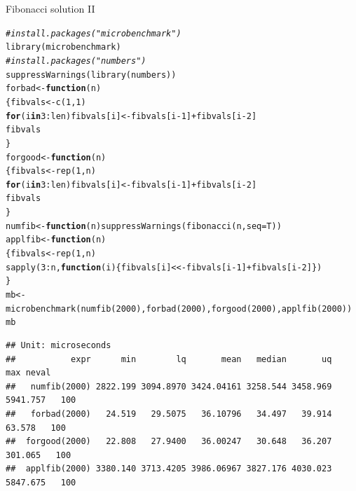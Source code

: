 \documentclass[xcolor=table,           xcolor=dvipsnames]{beamer}\usepackage[]{graphicx}\usepackage[]{color}
\makeatletter
\newcommand{\hlnum}[1]{\textcolor[rgb]{0,0,0}{#1}}
\newcommand{\hlcom}[1]{\textcolor[rgb]{0,0.392,0}{\textit{#1}}}
\newcommand{\hlopt}[1]{\textcolor[rgb]{0,0,0}{#1}}
\newcommand{\hlstd}[1]{\textcolor[rgb]{0,0,0}{#1}}
\newcommand{\hlkwa}[1]{\textcolor[rgb]{1,0,0}{\textbf{#1}}}
\newcommand{\hlkwb}[1]{\textcolor[rgb]{0,0,0}{#1}}
\newcommand{\hlkwc}[1]{\textcolor[rgb]{1,0,1}{#1}}
\newcommand{\hlkwd}[1]{\textcolor[rgb]{0,0,1}{#1}}
\newenvironment{kframe}{%
 \def\at@end@of@kframe{}%
 \ifinner\ifhmode%
  \def\at@end@of@kframe{\end{minipage}}%
  \begin{minipage}{\columnwidth}%
 \fi\fi%
 \def\FrameCommand##1{\hskip\@totalleftmargin \hskip-\fboxsep
 \colorbox{shadecolor}{##1}\hskip-\fboxsep
     \hskip-\linewidth \hskip-\@totalleftmargin \hskip\columnwidth}%
 \MakeFramed {\advance\hsize-\width
   \@totalleftmargin\z@ \linewidth\hsize
   \@setminipage}}%
 {\par\unskip\endMakeFramed%
 \at@end@of@kframe}
\newenvironment{knitrout}{}{} %
\makeatother
\begin{document}
\begin{frame}[fragile]{Fibonacci solution II}
\begin{knitrout}\tiny
{}\color{fgcolor}\begin{kframe}
\begin{alltt}
\hlcom{#install.packages("microbenchmark")}
\hlkwd{library}\hlstd{(microbenchmark)}
\hlcom{#install.packages("numbers")}
\hlkwd{suppressWarnings}\hlstd{(}\hlkwd{library}\hlstd{(numbers))}
\hlstd{forbad} \hlkwb{<-} \hlkwa{function}\hlstd{(}\hlkwc{n}\hlstd{)}
  \hlstd{\{fibvals} \hlkwb{<-} \hlkwd{c}\hlstd{(}\hlnum{1}\hlstd{,}\hlnum{1}\hlstd{)}
  \hlkwa{for} \hlstd{(i} \hlkwa{in} \hlnum{3}\hlopt{:}\hlstd{len) fibvals[i]} \hlkwb{<-} \hlstd{fibvals[i}\hlopt{-}\hlnum{1}\hlstd{]}\hlopt{+}\hlstd{fibvals[i}\hlopt{-}\hlnum{2}\hlstd{]}
  \hlstd{fibvals}
  \hlstd{\}}
\hlstd{forgood} \hlkwb{<-} \hlkwa{function}\hlstd{(}\hlkwc{n}\hlstd{)}
  \hlstd{\{fibvals} \hlkwb{<-} \hlkwd{rep}\hlstd{(}\hlnum{1}\hlstd{,n)}
  \hlkwa{for} \hlstd{(i} \hlkwa{in} \hlnum{3}\hlopt{:}\hlstd{len) fibvals[i]} \hlkwb{<-} \hlstd{fibvals[i}\hlopt{-}\hlnum{1}\hlstd{]}\hlopt{+}\hlstd{fibvals[i}\hlopt{-}\hlnum{2}\hlstd{]}
  \hlstd{fibvals}
  \hlstd{\}}
\hlstd{numfib} \hlkwb{<-} \hlkwa{function}\hlstd{(}\hlkwc{n}\hlstd{)} \hlkwd{suppressWarnings}\hlstd{(}\hlkwd{fibonacci}\hlstd{(n,} \hlkwc{seq}\hlstd{=T))}
\hlstd{applfib} \hlkwb{<-} \hlkwa{function}\hlstd{(}\hlkwc{n}\hlstd{)}
  \hlstd{\{fibvals} \hlkwb{<-} \hlkwd{rep}\hlstd{(}\hlnum{1}\hlstd{,n)}
  \hlkwd{sapply}\hlstd{(}\hlnum{3}\hlopt{:}\hlstd{n,} \hlkwa{function}\hlstd{(}\hlkwc{i}\hlstd{) \{fibvals[i]}\hlkwb{<<-}\hlstd{fibvals[i}\hlopt{-}\hlnum{1}\hlstd{]}\hlopt{+}\hlstd{fibvals[i}\hlopt{-}\hlnum{2}\hlstd{]\})}
  \hlstd{\}}
\hlstd{mb} \hlkwb{<-} \hlkwd{microbenchmark}\hlstd{(}\hlkwd{numfib}\hlstd{(}\hlnum{2000}\hlstd{),} \hlkwd{forbad}\hlstd{(}\hlnum{2000}\hlstd{),} \hlkwd{forgood}\hlstd{(}\hlnum{2000}\hlstd{),} \hlkwd{applfib}\hlstd{(}\hlnum{2000}\hlstd{))}
\hlstd{mb}
\end{alltt}
\begin{verbatim}
## Unit: microseconds
##           expr      min        lq       mean   median       uq      max neval
##   numfib(2000) 2822.199 3094.8970 3424.04161 3258.544 3458.969 5941.757   100
##   forbad(2000)   24.519   29.5075   36.10796   34.497   39.914   63.578   100
##  forgood(2000)   22.808   27.9400   36.00247   30.648   36.207  301.065   100
##  applfib(2000) 3380.140 3713.4205 3986.06967 3827.176 4030.023 5847.675   100
\end{verbatim}
\end{kframe}
\end{knitrout}

\end{frame}
\end{document}
